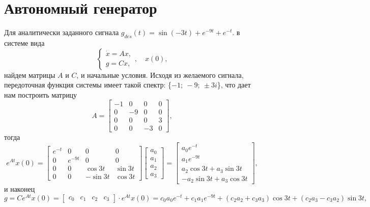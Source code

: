 \section{Автономный генератор}

Для аналитически заданного сигнала $g_{des}(t)=\sin (-3t) + e^{-9t} + e^{-t}$.
в системе вида
\begin{equation*}
    \begin{cases}
        \dot x=Ax,\\
        g=Cx,
    \end{cases},\quad x(0),
\end{equation*}
найдем матрицы $A$ и $C$, и начальные условия. Исходя из желаемого сигнала,
передоточная функция системы имеет такой спектр: \{$-1;\: -9;\: \pm3i$\},
что дает нам построить матрицу
\begin{equation*}
    A=\begin{bmatrix}
        -1&0&0&0\\0&-9&0&0\\0&0&0&3\\0&0&-3&0
    \end{bmatrix},
\end{equation*}
тогда
\begin{equation*}
    e^{At}x(0)=\begin{bmatrix}
        e^{-t}&0&0&0\\0&e^{-9t}&0&0\\0&0&\cos 3t&\sin 3t\\0&0&-\sin 3t&\cos 3t
    \end{bmatrix}
    \begin{bmatrix}
        a_0\\a_1\\a_2\\a_3
    \end{bmatrix}=
    \begin{bmatrix}
        a_0e^{-t}\\a_1e^{-9t}\\a_2\cos 3t+a_3\sin 3t\\-a_2\sin 3t+a_3\cos 3t
    \end{bmatrix},
\end{equation*}
и наконец
\begin{equation*}
    g=Ce^{At}x(0)=\begin{bmatrix}
        c_0&c_1&c_2&c_3
    \end{bmatrix}\cdot e^{At}x(0)=
    c_0a_0e^{-t}+c_1a_1e^{-9t}+(c_2a_2+c_3a_3)\cos 3t+(c_2a_3-c_3a_2)\sin 3t,
\end{equation*}
